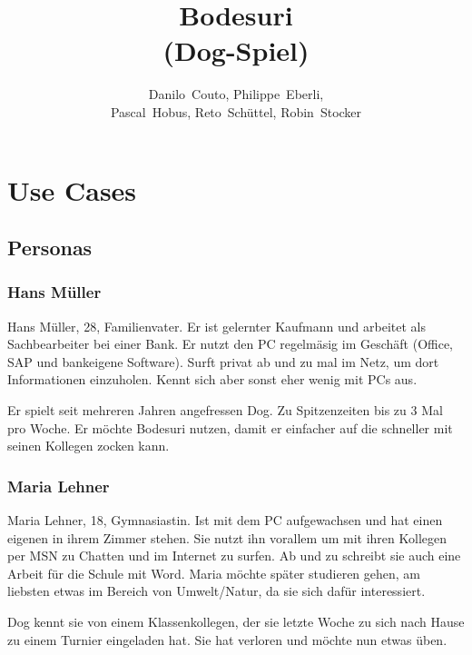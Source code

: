 \documentclass[a4paper,12pt,halfparskip,DIV14]{scrreprt}
\begin{document}
\title{Bodesuri \\ (Dog-Spiel)}
\subject{SE2-Projekt}
\author{Danilo~Couto, Philippe~Eberli, \\ Pascal~Hobus, Reto~Schüttel, Robin~Stocker}
\maketitle


\tableofcontents
\thispagestyle{plain}
\newpage



\chapter{Use Cases}\label{cha:use_cases} %
\section{Personas}\label{sec:personas} %
\subsection{Hans Müller}\label{sub:hans_müller} %
Hans Müller, 28, Familienvater. Er ist gelernter Kaufmann und arbeitet als Sachbearbeiter bei einer Bank. Er nutzt den PC regelmäsig im Geschäft (Office, SAP und bankeigene Software). Surft privat ab und zu mal im Netz, um dort Informationen einzuholen. Kennt sich aber sonst eher wenig mit PCs aus. 

Er spielt seit mehreren Jahren angefressen Dog. Zu Spitzenzeiten bis zu 3 Mal pro Woche. Er möchte Bodesuri nutzen, damit er einfacher auf die schneller mit seinen Kollegen zocken kann. 

\subsection{Maria Lehner}\label{sub:maria_lehner} %
Maria Lehner, 18, Gymnasiastin. Ist mit dem PC aufgewachsen und hat einen eigenen in ihrem Zimmer stehen. Sie nutzt ihn vorallem um mit ihren Kollegen per MSN zu Chatten und im Internet zu surfen. Ab und zu schreibt sie auch eine Arbeit für die Schule mit Word. Maria möchte später studieren gehen, am liebsten etwas im Bereich von Umwelt/Natur, da sie sich dafür interessiert. 

Dog kennt sie von einem Klassenkollegen, der sie letzte Woche zu sich nach Hause zu einem Turnier eingeladen hat. Sie hat verloren und möchte nun etwas üben.
\end{document}
